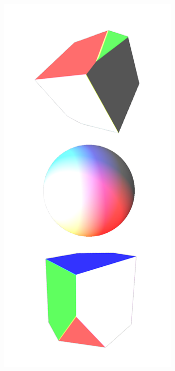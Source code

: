 \documentclass{l4proj}
\begin{document}
\begin{figure}[H]
  \begin{subfigure}[b]{0.25\textwidth}
    \includegraphics[width=\textwidth]{images/textures/no-pattern-rgbw.png}

\end{subfigure}
\end{figure}
\end{document}

